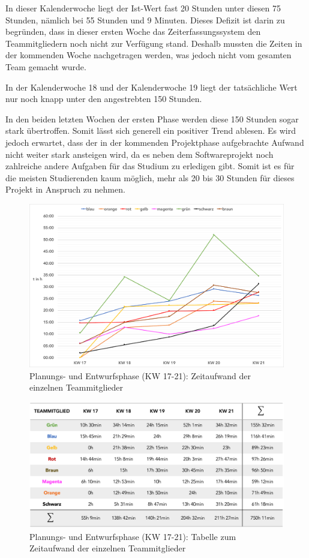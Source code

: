 \documentclass[../review_3.tex]{subfiles}
\begin{document}
In dieser Kalenderwoche liegt der Ist-Wert fast 20 Stunden unter diesen 75 Stunden, nämlich bei 55 Stunden und 9 Minuten. Dieses Defizit ist darin zu begründen, dass in dieser ersten Woche das Zeiterfassungssystem den Teammitgliedern noch nicht zur Verfügung stand. Deshalb mussten die Zeiten in der kommenden Woche nachgetragen werden, was jedoch nicht vom gesamten Team gemacht wurde.

In der Kalenderwoche 18 und der Kalenderwoche 19 liegt der tatsächliche Wert nur noch knapp unter den angestrebten 150 Stunden.

In den beiden letzten Wochen der ersten Phase werden diese 150 Stunden sogar stark übertroffen.
Somit lässt sich generell ein positiver Trend ablesen. Es wird jedoch erwartet, dass der in der kommenden Projektphase aufgebrachte Aufwand nicht weiter stark ansteigen wird, da es neben dem Softwareprojekt noch zahlreiche andere Aufgaben für das Studium zu erledigen gibt. Somit ist es für die meisten Studierenden kaum möglich, mehr als 20 bis 30 Stunden für dieses Projekt in Anspruch zu nehmen.

\begin{figure} [h]
    \centering
    \includegraphics[width = \linewidth]{img/Kimai3.pdf}
    \caption{Planungs- und Entwurfsphase (KW 17-21): Zeitaufwand der einzelnen Teammitglieder}
    \label{teammitglieder}
\end{figure}

\begin{figure} [h]
    \centering
    \includegraphics[width = \linewidth]{img/Kimai4.png}
    \caption{Planungs- und Entwurfsphase (KW 17-21): Tabelle zum Zeitaufwand der einzelnen Teammitglieder}
    \label{teammitglieder2}
\end{figure}
\end{document}

